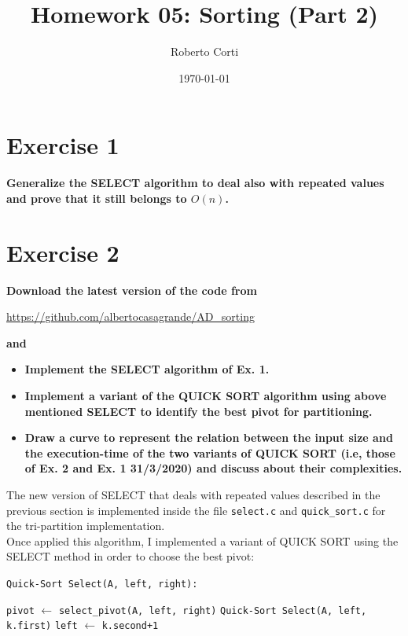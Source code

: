 \documentclass{article}
\title{Homework 05: Sorting (Part 2)}
\date{\today}
\author{Roberto Corti}
\begin{document}
	\maketitle
	
	\section*{Exercise 1}
	\textbf{Generalize the SELECT algorithm to deal also with repeated values and prove that it still belongs to $O(n)$.}
	
	\section*{Exercise 2}
	\textbf{Download the latest version of the code from}
	\begin{center}
		\url{https://github.com/albertocasagrande/AD_sorting}
	\end{center}
	\textbf{and} 
	\begin{itemize}
		\item \textbf{Implement the SELECT algorithm of Ex. 1.}
		\item \textbf{Implement a variant of the QUICK SORT algorithm using above mentioned SELECT to identify the best pivot for partitioning.}
		\item \textbf{Draw a curve to represent the relation between the input size and the execution-time of the two variants of QUICK SORT (i.e, those of Ex. 2 and Ex. 1 31/3/2020) and discuss about their complexities.}
	\end{itemize}

	\noindent The new version of SELECT that deals with repeated values described in the previous section is implemented inside the file \texttt{select.c} and \texttt{quick\_sort.c} for the tri-partition implementation.\\
	Once applied this algorithm, I implemented a variant of QUICK SORT using the SELECT method in order to choose the best pivot:
	
		\begin{algorithm}
		\texttt{Quick-Sort Select(A, left, right):} \label{ex2}
		\begin{algorithmic}
			\State \texttt{pivot} $\gets$ \texttt{select\_pivot(A, left, right)}
			\State \texttt{Quick-Sort  Select(A, left, k.first)}
			\State \texttt{left} $\gets$ \texttt{k.second+1}
			\EndWhile
			
		\end{algorithmic}
	\end{algorithm}
\end{document}
